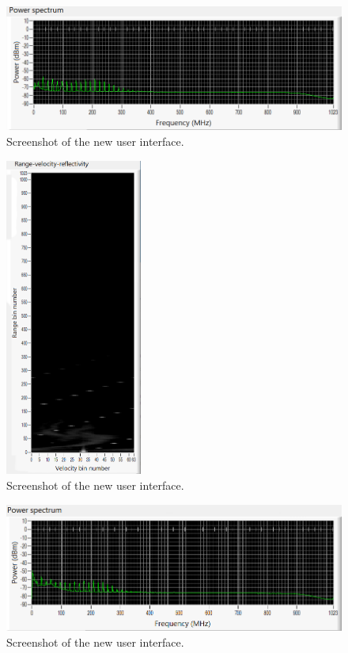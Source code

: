 \documentclass{article}
\begin{document}
\begin{figure}
	\centering
	\includegraphics[width=\textwidth]{working-cloud_power-spect}
	\caption{Screenshot of the new user interface.}
	\label{fig:WorkingCloudPowerSpectrum}
\end{figure}

\begin{figure}
	\centering
	\includegraphics[width=0.4\textwidth]{working-hail_range-doppler}
	\caption{Screenshot of the new user interface.}
	\label{fig:WorkingHailRangeDoppler}
\end{figure}

\begin{figure}
	\centering
	\includegraphics[width=\textwidth]{working-hail_power-spect}
	\caption{Screenshot of the new user interface.}
	\label{fig:WorkingHailPowerSpectrum}
\end{figure}
\end{document}
